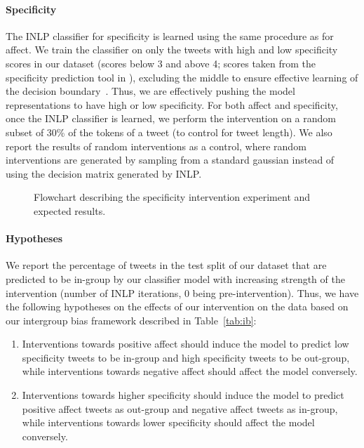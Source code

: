 \paragraph{Specificity} The INLP classifier for specificity is learned using the same procedure as for affect. We train the classifier on only the tweets with high and low specificity scores in our dataset (scores below 3 and above 4; scores taken from the specificity prediction tool in \citet{gao_predicting_2019}), excluding the middle to ensure effective learning of the decision boundary~\citep{gelman2009}. Thus, we are effectively pushing the model representations to have high or low specificity. For both affect and specificity, once the INLP classifier is learned, we perform the intervention on a random subset of 30\% of the tokens of a tweet (to control for tweet length). We also report the results of random interventions as a control, where random interventions are generated by sampling from a standard gaussian instead of using the decision matrix generated by INLP.

\begin{figure*}[t]
    \centering
    
    \caption{Flowchart describing the specificity intervention experiment and expected results.}
    \label{fig:flowchart}
\end{figure*}

\paragraph{Hypotheses} We report the percentage of tweets in the test split of our dataset that are predicted to be in-group by our classifier model with increasing strength of the intervention (number of INLP iterations, 0 being pre-intervention). Thus, we have the following hypotheses on the effects of our intervention on the data based on our intergroup bias framework described in Table~\ref{tab:ib}:

\begin{enumerate}
    \item Interventions towards positive affect should induce the model to predict low specificity  tweets to be in-group and high specificity tweets to be out-group, while interventions towards negative affect should affect the model conversely.
    \item Interventions towards higher specificity should induce the model to predict positive affect tweets as out-group and negative affect tweets as in-group, while interventions towards lower specificity should affect the model conversely.
\end{enumerate}

